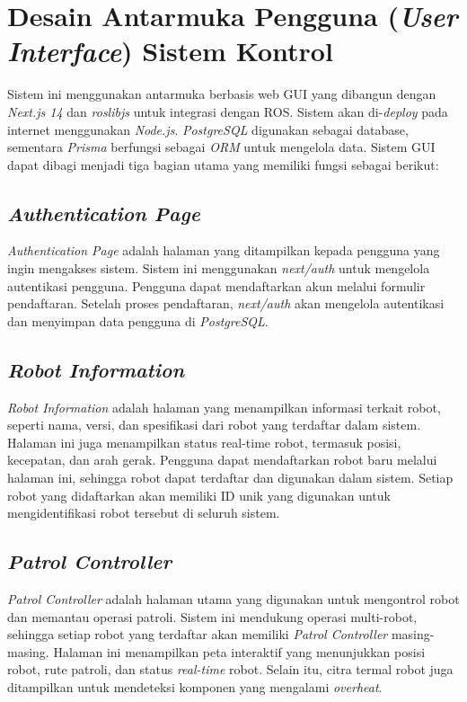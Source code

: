 \section{Desain Antarmuka Pengguna (\emph{User Interface}) Sistem Kontrol}

Sistem ini menggunakan antarmuka berbasis web GUI yang dibangun dengan \emph{Next.js 14} dan \emph{roslibjs} untuk integrasi dengan ROS. Sistem akan di-\emph{deploy} pada internet menggunakan \emph{Node.js}. \emph{PostgreSQL} digunakan sebagai database, sementara \emph{Prisma} berfungsi sebagai \emph{ORM} untuk mengelola data. Sistem GUI dapat dibagi menjadi tiga bagian utama yang memiliki fungsi sebagai berikut:

\subsection{\emph{Authentication Page}}

\emph{Authentication Page} adalah halaman yang ditampilkan kepada pengguna yang ingin mengakses sistem. Sistem ini menggunakan \emph{next/auth} untuk mengelola autentikasi pengguna. Pengguna dapat mendaftarkan akun melalui formulir pendaftaran. Setelah proses pendaftaran, \emph{next/auth} akan mengelola autentikasi dan menyimpan data pengguna di \emph{PostgreSQL}.

\subsection{\emph{Robot Information}}

\emph{Robot Information} adalah halaman yang menampilkan informasi terkait robot, seperti nama, versi, dan spesifikasi dari robot yang terdaftar dalam sistem. Halaman ini juga menampilkan status real-time robot, termasuk posisi, kecepatan, dan arah gerak. Pengguna dapat mendaftarkan robot baru melalui halaman ini, sehingga robot dapat terdaftar dan digunakan dalam sistem. Setiap robot yang didaftarkan akan memiliki ID unik yang digunakan untuk mengidentifikasi robot tersebut di seluruh sistem.

\subsection{\emph{Patrol Controller}}

\emph{Patrol Controller} adalah halaman utama yang digunakan untuk mengontrol robot dan memantau operasi patroli. Sistem ini mendukung operasi multi-robot, sehingga setiap robot yang terdaftar akan memiliki \emph{Patrol Controller} masing-masing. Halaman ini menampilkan peta interaktif yang menunjukkan posisi robot, rute patroli, dan status \emph{real-time} robot. Selain itu, citra termal robot juga ditampilkan untuk mendeteksi komponen yang mengalami \emph{overheat}. 

